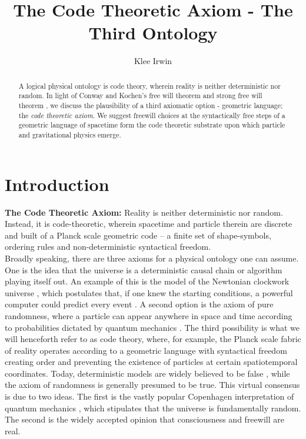 \documentclass[submission,copyright,creativecommons]{eptcs}
\title{The Code Theoretic Axiom - The Third Ontology}
\author{Klee Irwin
\institute{Quantum Gravity Research\\ Los Angeles, USA}
\email{Klee@QuantumGravityResearch.org}
}
\begin{document}
\maketitle

\begin{abstract}
A logical physical ontology is code theory, wherein reality is neither deterministic nor random. In light of Conway and Kochen’s free will theorem \cite{conway2006free} and strong free will theorem \cite{conway2009strong}, we discuss the plausibility of a third axiomatic option - geometric language; the \textit{code theoretic axiom}. We suggest freewill choices at the syntactically free steps of a geometric language of spacetime form the code theoretic substrate upon which particle and gravitational physics emerge. 
\end{abstract}


\section{Introduction}
\label{intro}

\textbf{The Code Theoretic Axiom: }Reality is neither deterministic nor random. Instead, it is code-theoretic, wherein spacetime and particle therein are discrete and built of a Planck scale geometric code -- a finite set of shape-symbols, ordering rules and non-deterministic syntactical freedom.
\\

Broadly speaking, there are three axioms for a physical ontology one can assume. One is the idea that the universe is a deterministic causal chain or algorithm playing itself out. An example of this is the model of the Newtonian clockwork universe \cite{levinson2012clockwork}, which postulates that, if one knew the starting conditions, a powerful computer could predict every event \cite{laplace2012pierre}. A second option is the axiom of pure randomness, where a particle can appear anywhere in space and time according to probabilities dictated by quantum mechanics \cite{zettili2009quantum}. The third possibility is what we will henceforth refer to as code theory, where, for example, the Planck scale fabric of reality operates according to a geometric language with syntactical freedom creating order and preventing the existence of particles at certain spatiotemporal coordinates. Today, deterministic models are widely believed to be false \cite{bourget2014philosophers}, while the axiom of randomness is generally presumed to be true. This virtual consensus is due to two ideas. The first is the vastly popular Copenhagen interpretation of quantum mechanics \cite{griffiths2005introduction}, which stipulates that the universe is fundamentally random. The second is the widely accepted opinion that consciousness and freewill are real. 
\end{document}
